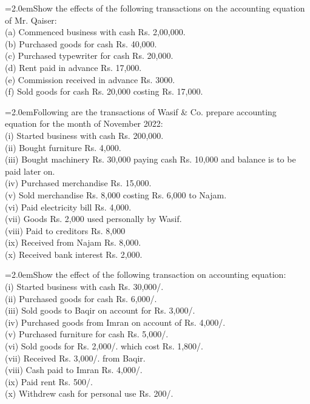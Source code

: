 \documentclass[11pt,a4paper]{article}
\newcommand{\lqn}[2]{\Needspace{6\baselineskip}\par\medskip\noindent\hangindent=2.0em\hangafter=1\makebox[2.0em][l]{\textbf{#1.}}#2\par}
\begin{document}
\lqn{5}{Show the effects of the following transactions on the accounting equation of Mr. Qaiser:\\
(a) Commenced business with cash Rs. 2,00,000.\\
(b) Purchased goods for cash Rs. 40,000.\\
(c) Purchased typewriter for cash Rs. 20,000.\\
(d) Rent paid in advance Rs. 17,000.\\
(e) Commission received in advance Rs. 3000.\\
(f) Sold goods for cash Rs. 20,000 costing Rs. 17,000.\par
}
\lqn{6}{Following are the transactions of Wasif \& Co. prepare accounting equation for the month of November 2022:\\
(i) Started business with cash Rs. 200,000.\\
(ii) Bought furniture Rs. 4,000.\\
(iii) Bought machinery Rs. 30,000 paying cash Rs. 10,000 and balance is to be paid later on.\\
(iv) Purchased merchandise Rs. 15,000.\\
(v) Sold merchandise Rs. 8,000 costing Rs. 6,000 to Najam.\\
(vi) Paid electricity bill Rs. 4,000.\\
(vii) Goods Rs. 2,000 used personally by Wasif.\\
(viii) Paid to creditors Rs. 8,000\\
(ix) Received from Najam Rs. 8,000.\\
(x) Received bank interest Rs. 2,000.\par
}
\lqn{7}{Show the effect of the following transaction on accounting equation:\\
(i) Started business with cash Rs. 30,000/.\\
(ii) Purchased goods for cash Rs. 6,000/.\\
(iii) Sold goods to Baqir on account for Rs. 3,000/.\\
(iv) Purchased goods from Imran on account of Rs. 4,000/.\\
(v) Purchased furniture for cash Rs. 5,000/.\\
(vi) Sold goods for Rs. 2,000/. which cost Rs. 1,800/.\\
(vii) Received Rs. 3,000/. from Baqir.\\
(viii) Cash paid to Imran Rs. 4,000/.\\
(ix) Paid rent Rs. 500/.\\
(x) Withdrew cash for personal use Rs. 200/.\par
}
\end{document}
